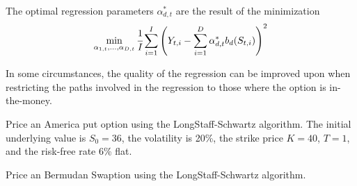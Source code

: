 \documentclass[12pt,a4paper]{article}
\begin{document}
The optimal regression parameters $\alpha^*_{d,t}$ are the result of the minimization
\begin{equation}
	\min_{\alpha_{1,t},\ldots,\alpha_{D,t}}\cfrac{1}{I}\sum_{i=1}^I \left(Y_{t,i}-\sum_{i=1}^D\alpha^*_{d,t}b_d(S_{t,i})\right)^2
	\label{eq:optimization_alphas}	
\end{equation}

In some circumstances, the quality of the regression can be improved upon when restricting the paths involved in the regression to those where the option is in-the-money.

\begin{question}
Price an America put option using the LongStaff-Schwartz algorithm. The initial underlying value is $S_0=36$, the volatility is 20\%, the strike price $K=40$, $T=1$, and the risk-free rate 6\% flat.
\end{question}

\begin{question}
Price an Bermudan Swaption using the LongStaff-Schwartz algorithm. %
\end{question}
\end{document}
